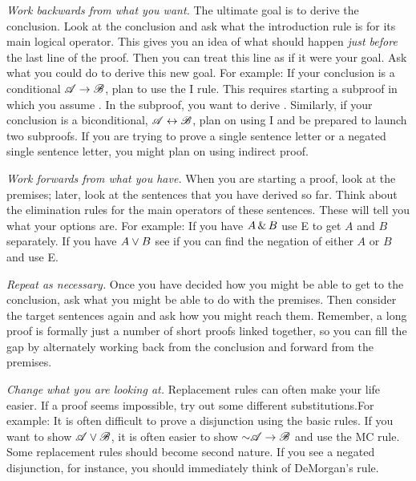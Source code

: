 {\emph{Work backwards from what you want.}
The ultimate goal is to derive the conclusion. Look at the conclusion and ask what the introduction rule is for its main logical operator. This gives you an idea of what should happen \emph{just before} the last line of the proof. Then you can treat this line as if it were your goal. Ask what you could do to derive this new goal. For example: If your conclusion is a conditional $\mathscr{A}\rightarrow\mathscr{B}$, plan to use the {\eif}I rule. This requires starting a subproof in which you assume . In the subproof, you want to derive . Similarly, if your conclusion is a biconditional, $\mathscr{A} \leftrightarrow \mathscr{B}$, plan on using {\eiff}I and be prepared to launch two subproofs. If you are trying to prove a single sentence letter or a negated single sentence letter, you might plan on using indirect proof. 


\emph{Work forwards from what you have.}
When you are starting a proof, look at the premises; later, look at the sentences that you have derived so far. Think about the elimination rules for the main operators of these sentences. These will tell you what your options are. For example: If you have $A \,\&\, B$ use \eand E to get $A$ and $B$ separately. If you have $A \vee B$ see if you can find the negation of either $A$ or $B$ and use \eor E.

\emph{Repeat as necessary.} Once you have decided how you might be able to get to the conclusion, ask what you might be able to do with the premises. Then consider the target sentences again and ask how you might reach them.  Remember, a long proof is formally just a number of short proofs linked together, so you can fill the gap by alternately working back from the conclusion and forward from the premises.


\emph{Change what you are looking at.} Replacement rules can often make your life easier. If a proof seems impossible, try out some different substitutions.For example: It is often difficult to prove a disjunction using the basic rules. If you want to show $\mathscr{A}\vee\mathscr{B}$, it is often easier to show $\mathord{\sim}\mathscr{A}\rightarrow\mathscr{B}$ and use the MC rule. Some replacement rules should become second nature. If you see a negated disjunction, for instance, you should immediately think of DeMorgan's rule.

}
